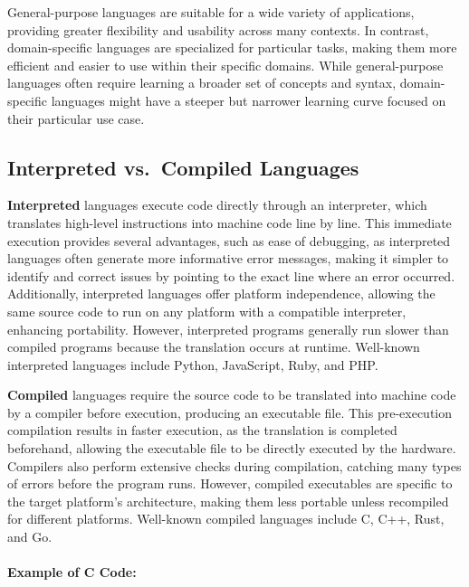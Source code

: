 \documentclass[
  letterpaper,
  DIV=11,
  numbers=noendperiod]{scrreprt}
\let\oldparagraph\paragraph
\renewcommand{\paragraph}[1]{\oldparagraph{#1}\mbox{}}
\begin{document}
General-purpose languages are suitable for a wide variety of
applications, providing greater flexibility and usability across many
contexts. In contrast, domain-specific languages are specialized for
particular tasks, making them more efficient and easier to use within
their specific domains. While general-purpose languages often require
learning a broader set of concepts and syntax, domain-specific languages
might have a steeper but narrower learning curve focused on their
particular use case.

\hypertarget{interpreted-vs.-compiled-languages}{%
\subsection{Interpreted vs.~Compiled
Languages}\label{interpreted-vs.-compiled-languages}}

\textbf{Interpreted} languages execute code directly through an
interpreter, which translates high-level instructions into machine code
line by line. This immediate execution provides several advantages, such
as ease of debugging, as interpreted languages often generate more
informative error messages, making it simpler to identify and correct
issues by pointing to the exact line where an error occurred.
Additionally, interpreted languages offer platform independence,
allowing the same source code to run on any platform with a compatible
interpreter, enhancing portability. However, interpreted programs
generally run slower than compiled programs because the translation
occurs at runtime. Well-known interpreted languages include Python,
JavaScript, Ruby, and PHP.

\textbf{Compiled} languages require the source code to be translated
into machine code by a compiler before execution, producing an
executable file. This pre-execution compilation results in faster
execution, as the translation is completed beforehand, allowing the
executable file to be directly executed by the hardware. Compilers also
perform extensive checks during compilation, catching many types of
errors before the program runs. However, compiled executables are
specific to the target platform's architecture, making them less
portable unless recompiled for different platforms. Well-known compiled
languages include C, C++, Rust, and Go.

\hypertarget{example-of-c-code}{%
\paragraph{Example of C Code:}\label{example-of-c-code}}
\end{document}
